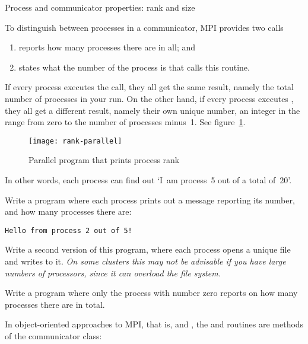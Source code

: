  {Process and communicator properties: rank and size}

To distinguish between processes in a communicator, MPI provides two calls
\begin{enumerate}
\item {} reports how many processes there are in all; and
\item {} states what the number of the
  process is that calls this routine.
\end{enumerate}

If every process executes the  call, they all get the
same result, namely the total number of processes in your run.
%
On the
other hand, if every process executes , they all get
a different result, namely their own unique number, an integer in the
range from zero to the number of processes minus~1.
See figure~\ref{fig:rank-parallel}.
%
\begin{figure}[ht]
  \texttt{[image: rank-parallel]}
  \caption{Parallel program that prints process rank}
  \label{fig:rank-parallel}
\end{figure}
%
In other words, each process can find out `I~am process~5
out of a total of~20'.


\begin{exercise}
  \label{ex:hello3}
  Write a program where each process prints out a message
  reporting its number, and how many processes there are:
\begin{verbatim}
Hello from process 2 out of 5!
\end{verbatim}

  Write a second version of this program, where each process opens a
  unique file and writes to it. \emph{On some clusters this may not be
    advisable if you have large numbers of processors, since it can
    overload the file system.}
\end{exercise}

\begin{exercise}
  \label{ex:hello4}
  Write a program where only the process with number zero
  reports on how many processes there are in total.
\end{exercise}

In object-oriented approaches to MPI, that is,  and ,
the  and 
routines are methods of the communicator class:

